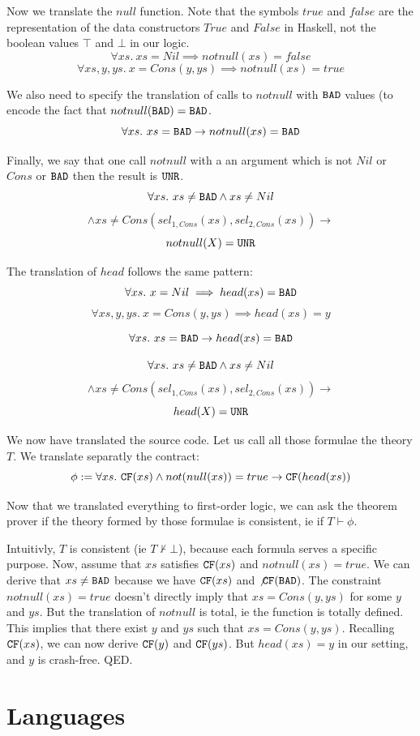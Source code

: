 \documentclass[preprint]{sigplanconf}
\begin{document}
Now we translate the $null$ function. Note that the symbols $true$ and
$false$ are the representation of the data constructors $True$ and
$False$ in Haskell, not the boolean values $\top$ and $\bot$ in our
logic.
$$\forall xs.~ xs=Nil \implies notnull(xs) = false$$
$$\forall xs,y,ys.~ x=Cons(y,ys) \implies notnull(xs) = true$$

We also need to specify the translation of calls to $notnull$ with
$\texttt{BAD}$ values (to encode the fact that $notnull(\texttt{BAD}) = \texttt{BAD}$.
$$\forall xs.~xs=\texttt{BAD} \to notnull(xs) = \texttt{BAD}$$

Finally, we say that one call $notnull$ with a an argument which is
not $Nil$ or $Cons$ or $\texttt{BAD}$ then the result is $\texttt{UNR}$.
$$\forall xs.~xs \neq \texttt{BAD} \land xs \neq Nil$$
$$\land xs \neq Cons(sel_{1,Cons}(xs),sel_{2,Cons}(xs)) \to $$
$$ notnull(X) = \texttt{UNR}$$

The translation of $head$ follows the same pattern:
$$\forall xs.~ x=Nil \implies head(xs) = \texttt{BAD}$$
$$\forall xs,y,ys.~ x=Cons(y,ys) \implies head(xs) = y$$

$$\forall xs.~xs=\texttt{BAD} \to head(xs) = \texttt{BAD}$$

$$\forall xs.~xs \neq \texttt{BAD} \land xs \neq Nil$$
$$ \land xs \neq Cons(sel_{1,Cons}(xs),sel_{2,Cons}(xs)) \to $$
$$ head(X) = \texttt{UNR}$$

We now have translated the source code. Let us call all those formulae
the theory $T$. We translate separatly the contract:
$$ \phi := \forall xs.~\texttt{CF}(xs) \land not(null(xs)) = true \to \texttt{CF}(head(xs)) $$

Now that we translated everything to first-order logic, we can ask the
theorem prover if the theory formed by those formulae is
consistent, ie if $T \vdash \phi$.

Intuitivly, $T$ is consistent (ie $T \not \vdash \bot$), because each
formula serves a specific purpose. Now, assume that $xs$ satisfies
$\texttt{CF}(xs)$ and $notnull(xs) = true$.  We can derive that $xs \neq \texttt{BAD}$
because we have $\texttt{CF}(xs)$ and $\not \texttt{CF}(\texttt{BAD})$. The constraint
$notnull(xs) = true$ doesn't directly imply that $xs = Cons(y,ys)$ for
some $y$ and $ys$. But the translation of $notnull$ is total, ie the
function is totally defined. This implies that there exist $y$ and
$ys$ such that $xs = Cons(y,ys)$. Recalling $\texttt{CF}(xs)$, we can now
derive $\texttt{CF}(y)$ and $\texttt{CF}(ys)$. But $head(xs) = y$ in our setting, and
$y$ is crash-free. QED.


\section{Languages}
\end{document}
